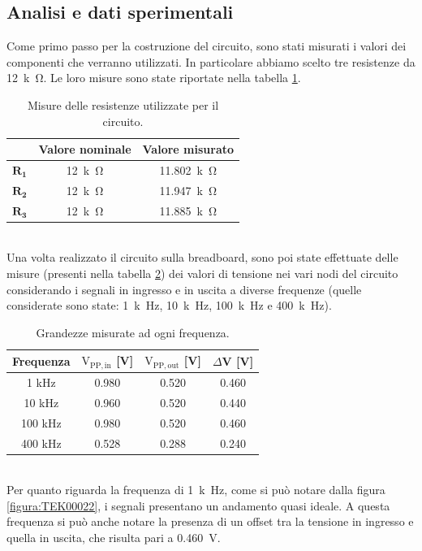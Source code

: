 \documentclass{report}
\begin{document}
\subsection{Analisi e dati sperimentali}
Come primo passo per la costruzione del circuito, sono stati misurati i valori dei componenti che verranno utilizzati. In particolare abbiamo scelto tre resistenze da \SI{12}{k\ohm}. Le loro misure sono state riportate nella tabella \ref{table:mis_res3}.
\begin{table}[h]
	\centering
	\begin{tabular}{|c|c|c|}
		\cline{2-3} 
		\multicolumn{1}{c|}{} & \textbf{Valore nominale} & \textbf{Valore misurato}\\ 
		\hline
		$\mathbf{R_1}$ & \SI{12}{k\ohm} & \SI{11.802}{k\ohm} \\ 
		\hline
		$\mathbf{R_2}$ & \SI{12}{k\ohm} & \SI{11.947}{k\ohm} \\ 
		\hline
		$\mathbf{R_3}$ & \SI{12}{k\ohm} & \SI{11.885}{k\ohm} \\ 
		\hline
	\end{tabular}
	\caption{Misure delle resistenze utilizzate per il circuito.}
	\label{table:mis_res3}
\end{table}
\\Una volta realizzato il circuito sulla breadboard, sono poi state effettuate delle misure (presenti nella tabella \ref{table:misure3}) dei valori di tensione nei vari nodi del circuito considerando i segnali in ingresso e in uscita a diverse frequenze (quelle considerate sono state: \SI{1}{k\hertz}, \SI{10}{k\hertz}, \SI{100}{k\hertz} e \SI{400}{k\hertz}).
\begin{table}[h!]
	\centering
	\begin{tabular}{|c|c|c|c|}
		\hline
		\textbf{Frequenza} & \boldmath$\displaystyle\mathrm{V_{PP,in}}$\textbf{ [V]} & \boldmath$\displaystyle\mathrm{{V_{PP,out}}}$\textbf{ [V]} & \boldmath$\Delta$\textbf{V [V]}\\
		\hline
		1 kHz & 0.980 & 0.520 & 0.460\\
		\hline
		10 kHz & 0.960 & 0.520 & 0.440\\
		\hline
		100 kHz & 0.980 & 0.520 & 0.460\\
		\hline
		400 kHz & 0.528 & 0.288 & 0.240\\
		\hline\end{tabular}
	\caption{Grandezze misurate ad ogni frequenza.}
	\label{table:misure3}
\end{table}
\\Per quanto riguarda la frequenza di \SI{1}{k\hertz}, come si può notare dalla figura \ref{figura:TEK00022}, i segnali presentano un andamento quasi ideale. A questa frequenza si può anche notare la presenza di un offset tra la tensione in ingresso e quella in uscita, che risulta pari a \SI{0.460}{\volt}.
\end{document}
